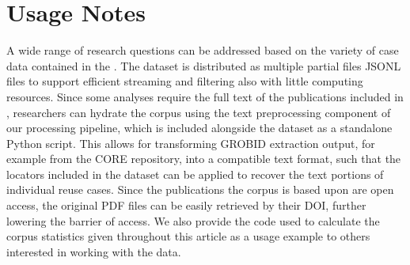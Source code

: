 \section*{Usage Notes}



A wide range of research questions can be addressed based on the variety of case data contained in the \webisReuseCorpus. The dataset is distributed as multiple partial files JSONL files to support efficient streaming and filtering also with little computing resources.
Since some analyses require the full text of the publications included in \webisReuseCorpus, researchers can hydrate the corpus using the text preprocessing component of our processing pipeline, which is included alongside the dataset as a standalone Python script. This allows for transforming GROBID extraction output, for example from the CORE repository, into a compatible text format, such that the locators included in the dataset can be applied to recover the text portions of individual reuse cases. Since the publications the corpus is based upon are open access, the original PDF files can be easily retrieved by their DOI, further lowering the barrier of access. We also provide the code used to calculate the corpus statistics given throughout this article as a usage example to others interested in working with the data.

